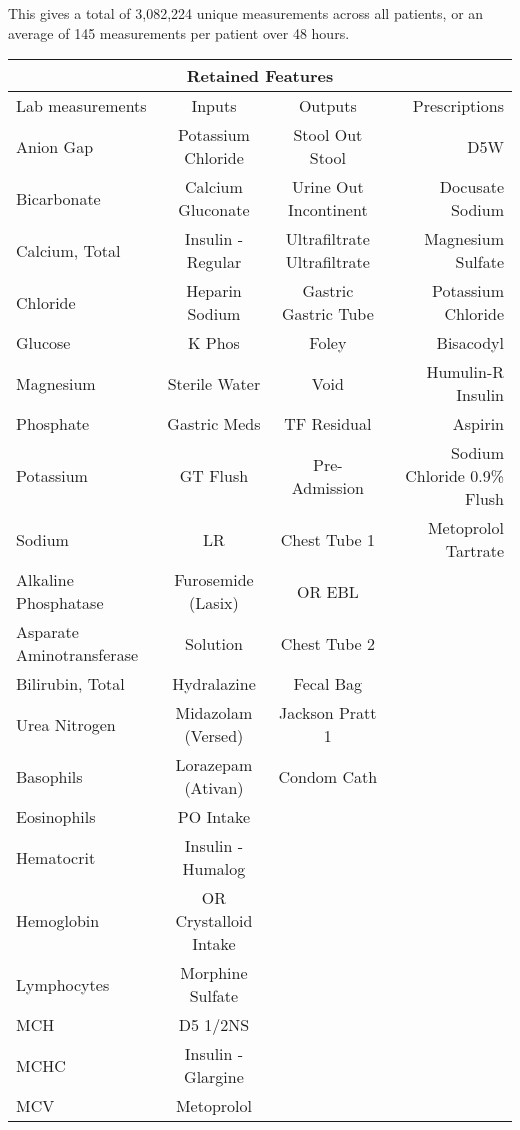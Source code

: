\documentclass{article}
\begin{document}
This gives a total of 3,082,224 unique measurements across all patients, or an average of 145 measurements per patient over 48 hours.

\begin{table}[htbp]
    \begin{adjustbox}{width=\textwidth}
   \begin{tabular}{| l | c | c | r | } \hline
     \multicolumn{4}{|c|}{\textbf{Retained Features}} \\
     \hline
      Lab measurements   & Inputs & Outputs & Prescriptions\\
      \hline
      Anion Gap & Potassium Chloride & Stool Out Stool & D5W \\
      Bicarbonate & Calcium Gluconate & Urine Out Incontinent & Docusate Sodium \\
      Calcium, Total & Insulin - Regular & Ultrafiltrate Ultrafiltrate & Magnesium Sulfate \\
      Chloride & Heparin Sodium & Gastric Gastric Tube & Potassium Chloride \\
Glucose & K Phos & Foley & Bisacodyl \\
       Magnesium & Sterile Water & Void & Humulin-R Insulin \\
       Phosphate & Gastric Meds & TF Residual & Aspirin \\
       Potassium & GT Flush &Pre-Admission & Sodium Chloride 0.9\%  Flush \\
       Sodium & LR & Chest Tube 1 & Metoprolol Tartrate \\
       Alkaline Phosphatase & Furosemide (Lasix) & OR EBL & \\
       Asparate Aminotransferase & Solution & Chest Tube 2 & \\
        Bilirubin, Total & Hydralazine & Fecal Bag & \\
       Urea Nitrogen & Midazolam (Versed) & Jackson Pratt 1 & \\
       Basophils & Lorazepam (Ativan) & Condom Cath & \\
       Eosinophils & PO Intake & & \\
       Hematocrit & Insulin - Humalog & & \\
       Hemoglobin & OR Crystalloid Intake & & \\
       Lymphocytes & Morphine Sulfate & & \\
       MCH & D5 1/2NS & & \\
       MCHC & Insulin - Glargine & & \\
       MCV & Metoprolol & & \\

\end{tabular}
\end{adjustbox}
\end{table}
\end{document}
